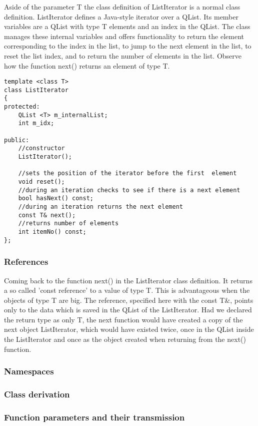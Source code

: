 Aside of the parameter T the class definition of ListIterator is a normal class definition. ListIterator defines a Java-style iterator over a QList. Its member variables are a QList with type T elements and an index in the QList. The class manages these internal variables and offers functionality to return the element corresponding to the index in the list, to jump to the next element in the list, to reset the list index, and to return the number of elements in the list. Observe how the function next() returns an element of type T.

\begin{lstlisting}
template <class T>
class ListIterator
{
protected:
    QList <T> m_internalList;
    int m_idx;

public:
    //constructor
    ListIterator();

    //sets the position of the iterator before the first  element
    void reset();
    //during an iteration checks to see if there is a next element
    bool hasNext() const;
    //during an iteration returns the next element
    const T& next();
    //returns number of elements
    int itemNo() const;
};
\end{lstlisting}

\subsubsection {References}

Coming back to the function next() in the ListIterator class definition. It returns a so called 'const reference' to a value of type T. This is advantageous when the objects of type T are big. The reference, specified here with the const T\&, points only to the data which is saved in the QList of the ListIterator. Had we declared the return type as only T, the next function would have created a copy of the next object ListIterator, which would have existed twice, once in the QList inside the ListIterator and once as the object created when returning from the next() function.

\subsubsection {Namespaces}
\subsubsection {Class derivation}
\subsubsection {Function parameters and their transmission}
